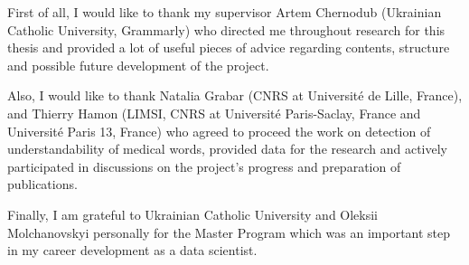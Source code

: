 \documentclass[
11pt, %
oneside, %
english, %
singlespacing, %
headsepline, %
]{MastersDoctoralThesis} %
\begin{document}
\begin{acknowledgements}
\addchaptertocentry{\acknowledgementname} %
First of all, I would like to thank my supervisor Artem Chernodub (Ukrainian Catholic University, Grammarly) who directed me throughout research for this thesis and provided a lot of useful pieces of advice regarding contents, structure and possible future development of the project. 

Also, I would like to thank Natalia Grabar (CNRS at Université de Lille, France), and Thierry Hamon (LIMSI, CNRS at Université Paris-Saclay, France and Université Paris 13, France) who agreed to proceed the work on detection of understandability of medical words, provided data for the research and actively participated in discussions on the project's progress and preparation of publications. 

Finally, I am grateful to Ukrainian Catholic University and Oleksii Molchanovskyi personally for the Master Program which was an important step in my career development as a data scientist. 

\end{acknowledgements}


\tableofcontents %

\listoffigures %

\listoftables %

\end{document}
